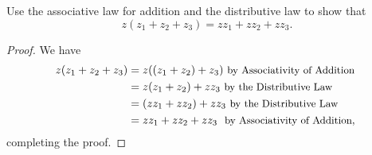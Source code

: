 \begin{problem}[Question 7]
    Use the associative law for addition and the distributive law to show that 
    \[
        z(z_1+z_2+z_3)=zz_1+zz_2+zz_3.
    \]
\end{problem}
\begin{proof}
    We have
    \begin{align*}
        z(z_1+z_2+z_3)&=z((z_1+z_2)+z_3) \ \small{\text{by Associativity of Addition}} \\
                &=z(z_1+z_2)+zz_3 \ \small{\text{by the Distributive Law}} \\
                &=(zz_1+zz_2)+zz_3 \ \small{\text{by the Distributive Law}} \\
                &=zz_1+zz_2+zz_3 \ \small{\text{ by Associativity of Addition, }} \\
    \end{align*}
    completing the proof.
\end{proof}

